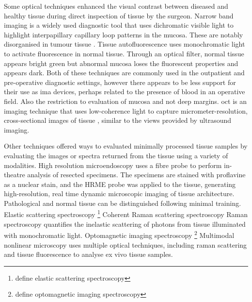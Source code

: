 Some optical techniques enhanced the visual contrast between diseased and healthy tissue during direct inspection of tissue by the surgeon. 
Narrow band imaging \cite{tirelliNarrowBandImaging2015, tirellig.TailoredResectionsOral2018} is a widely used diagnostic tool that uses dichromatic visible light to highlight interpapillary capillary loop patterns in the mucosa. 
These are notably disorganised in tumour tissue \cite{vuEfficacyNarrowBand2014}.
Tissue autofluorescence \cite{ohnishiy.UsefulnessFluorescenceVisualization2016} uses monochromatic light to activate fluorescence in normal tissue.
Through an optical filter, normal tissue appears bright green but abnormal mucosa loses the fluorescent properties and appears dark.
Both of these techniques are commonly used in the outpatient and pre-operative diagnostic settings, however there appears to be less support for their use as \gls{ima} devices, perhaps related to the presence of blood in an operative field. 
Also the restriction to evaluation of mucosa and not deep margins.
\Gls{oct} is an imaging technique that uses low-coherence light to capture micrometer-resolution, cross-sectional images of tissue \cite{hamdoonz.OpticalCoherenceTomography2016, heidaria.e.UseOpticalCoherence2020}, similar to the views provided by ultrasound imaging.

Other techniques offered ways to evaluated minimally processed tissue samples by evaluating the images or spectra returned from the tissue using a variety of modalities.
High resolution microendoscopy \cite{vilap.m.DiscriminationBenignNeoplastic2012, milesb.a.OperativeMarginControl2015} uses a fibre probe to perform in-theatre analysis of resected specimens.
The specimens are stained with proflavine as a nuclear stain, and the HRME probe was applied to the tissue, generating high-resolution, real time dynamic microscopic imaging of tissue architecture.
Pathological and normal tissue can be distinguished following minimal training.
Elastic scattering spectroscopy \cite{grilloneg.a.ColorCancerMargin2017}\footnote{define elastic scattering spectroscopy}
Coherent Raman scattering spectroscopy \cite{hoeslir.c.CoherentRamanScattering2017} Raman spectroscopy quantifies the inelastic scattering of photons from tissue illuminated with monochromatic light.
Optomagnetic imaging spectroscopy \cite{lisulb.PredictiveValueOptomagnetic2019}\footnote{define optomagnetic imaging spectroscopy} 
Multimodal nonlinear microscopy \cite{heukes.MultimodalNonlinearMicroscopy2016} uses multiple optical techniques, including raman scattering and tissue fluorescence to analyse ex vivo tissue samples.

